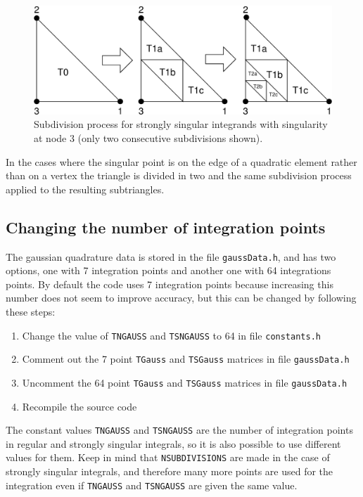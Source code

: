 \documentclass[12pt]{article}
\begin{document}
\begin{figure}[!hbt]
\begin{center}
\includegraphics[width=\textwidth]{strongly_singular.pdf}
\caption{Subdivision process for strongly singular integrands with singularity at node 3 (only two consecutive subdivisions shown).}
\end{center}
\end{figure}

In the cases where the singular point is on the edge of a quadratic element rather than on a vertex the triangle is divided in two and the same subdivision process applied to the resulting subtriangles.

\subsection*{Changing the number of integration points}
The gaussian quadrature data is stored in the file \verb+gaussData.h+, and has two options, one with 7 integration points and another one with 64 integrations points. By default the code uses 7 integration points because increasing this number does not seem to improve accuracy, but this can be changed by following these steps:

\begin{enumerate}
\item Change the value of \verb+TNGAUSS+ and \verb+TSNGAUSS+ to 64 in file \verb+constants.h+
\item Comment out the 7 point \verb+TGauss+ and \verb+TSGauss+ matrices in file \verb+gaussData.h+
\item Uncomment the 64 point \verb+TGauss+ and \verb+TSGauss+ matrices in file \verb+gaussData.h+
\item Recompile the source code
\end{enumerate}

The constant values \verb+TNGAUSS+ and \verb+TSNGAUSS+ are the number of integration points in regular and strongly singular integrals, so it is also possible to use different values for them. Keep in mind that \verb+NSUBDIVISIONS+ are made in the case of strongly singular integrals, and therefore many more points are used for the integration even if \verb+TNGAUSS+ and \verb+TSNGAUSS+ are given the same value.
\end{document}
